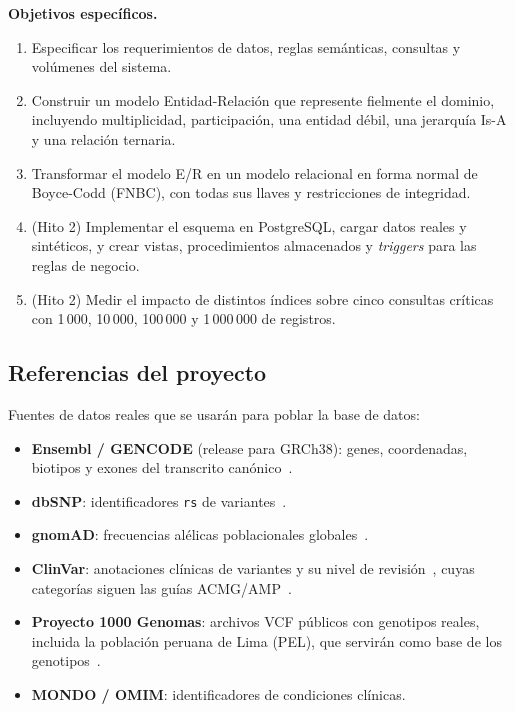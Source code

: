 \documentclass[11pt,a4paper]{article}
\newcommand{\tb}[1]{\texttt{#1}}
\begin{document}
\textbf{Objetivos específicos.}
\begin{enumerate}
  \item Especificar los requerimientos de datos, reglas semánticas, consultas y volúmenes del sistema.
  \item Construir un modelo Entidad-Relación que represente fielmente el dominio, incluyendo multiplicidad, participación, una entidad débil, una jerarquía Is-A y una relación ternaria.
  \item Transformar el modelo E/R en un modelo relacional en forma normal de Boyce-Codd (FNBC), con todas sus llaves y restricciones de integridad.
  \item (Hito 2) Implementar el esquema en PostgreSQL, cargar datos reales y sintéticos, y crear vistas, procedimientos almacenados y \emph{triggers} para las reglas de negocio.
  \item (Hito 2) Medir el impacto de distintos índices sobre cinco consultas críticas con 1\,000, 10\,000, 100\,000 y 1\,000\,000 de registros.
\end{enumerate}

\subsection{Referencias del proyecto}
\label{sec:referencias}

Fuentes de datos reales que se usarán para poblar la base de datos:

\begin{itemize}
  \item \textbf{Ensembl / GENCODE} (release para GRCh38): genes, coordenadas, biotipos y exones del transcrito canónico~\cite{ensembl}.
  \item \textbf{dbSNP}: identificadores \tb{rs} de variantes~\cite{dbsnp}.
  \item \textbf{gnomAD}: frecuencias alélicas poblacionales globales~\cite{gnomad}.
  \item \textbf{ClinVar}: anotaciones clínicas de variantes y su nivel de revisión~\cite{clinvar}, cuyas categorías siguen las guías ACMG/AMP~\cite{acmg}.
  \item \textbf{Proyecto 1000 Genomas}: archivos VCF públicos con genotipos reales, incluida la población peruana de Lima (PEL), que servirán como base de los genotipos~\cite{1000g}.
  \item \textbf{MONDO / OMIM}: identificadores de condiciones clínicas.
\end{itemize}
\end{document}
